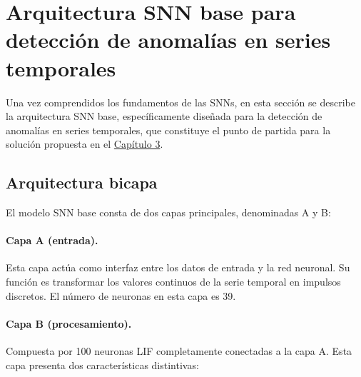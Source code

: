 \section{Arquitectura SNN base para detección de anomalías en series temporales}
\label{sec:arquitectura-snn-base}

Una vez comprendidos los fundamentos de las SNNs, en esta sección se describe la arquitectura SNN base, específicamente diseñada para la detección de anomalías en series temporales, que constituye el punto de partida para la solución propuesta en el \hyperref[chap:especificacion]{Capítulo 3}.




\subsection{Arquitectura bicapa}

El modelo SNN base consta de dos capas principales, denominadas A y B:

\paragraph{Capa A (entrada).} Esta capa actúa como interfaz entre los datos de entrada y la red neuronal. Su función es transformar los valores continuos de la serie temporal en impulsos discretos. El número de neuronas en esta capa es 39.

\paragraph{Capa B (procesamiento).} Compuesta por 100 neuronas LIF completamente conectadas a la capa A. Esta capa presenta dos características distintivas:

